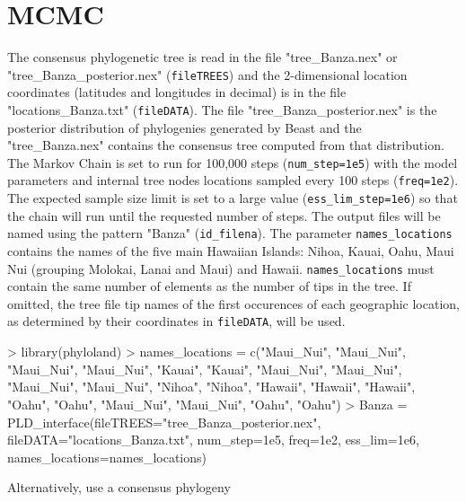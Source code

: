 \documentclass[a4paper]{article}
\begin{document}
\section{MCMC}
\hspace{12pt} The consensus phylogenetic tree is read in the file "tree\_Banza.nex" or "tree\_Banza\_posterior.nex" (\texttt{fileTREES}) and the 2-dimensional location coordinates (latitudes and longitudes in decimal) is in the file "locations\_Banza.txt" (\texttt{fileDATA}).
The file "tree\_Banza\_posterior.nex" is the posterior distribution of phylogenies generated by Beast and the "tree\_Banza.nex" contains the consensus tree computed from that distribution.
The Markov Chain is set to run for 100,000 steps (\texttt{num\_step=1e5}) with the model parameters and internal tree nodes locations sampled every 100 steps (\texttt{freq=1e2}).
The expected sample size limit is set to a large value (\texttt{ess\_lim\_step=1e6}) so that the chain will run until the requested number of steps.
The output files will be named using the pattern "Banza" (\texttt{id\_filena}).
The parameter \texttt{names\_locations} contains the names of the five main Hawaiian Islands: Nihoa, Kauai, Oahu, Maui Nui (grouping Molokai, Lanai and Maui) and Hawaii.
\texttt{names\_locations} must contain the same number of elements as the number of tips in the tree.
If omitted, the tree file tip names of the first occurences of each geographic location, as determined by their coordinates in \texttt{fileDATA}, will be used.


\begin{Schunk}
\begin{Sinput}
> library(phyloland)
> names_locations = c("Maui_Nui", "Maui_Nui", "Maui_Nui", "Maui_Nui", "Kauai", "Kauai",
 "Maui_Nui", "Maui_Nui", "Maui_Nui", "Maui_Nui", "Nihoa", "Nihoa", "Hawaii", "Hawaii",
  "Hawaii", "Oahu", "Oahu", "Maui_Nui", "Maui_Nui", "Oahu", "Oahu")
> Banza = PLD_interface(fileTREES="tree_Banza_posterior.nex", fileDATA="locations_Banza.txt",
 num_step=1e5, freq=1e2, ess_lim=1e6, names_locations=names_locations)
\end{Sinput}
\end{Schunk}

Alternatively, use a consensus phylogeny
\end{document}

